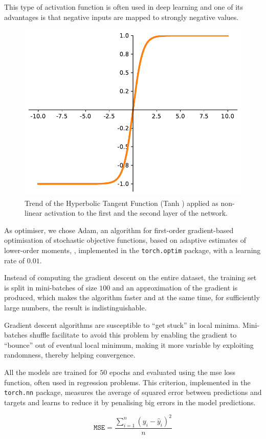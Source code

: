 This type of activation function is often used in deep learning and one of its 
advantages is that negative inputs are mapped to strongly negative values.

\begin{figure}[!htb]
	\centering
	\includegraphics[width=.5\textwidth]{contents/images/tanh2}%
	\caption[Trend of the Tanh activation function.]{Trend of the Hyperbolic 
	Tangent Function (Tanh ) applied as non-linear activation to the first and the 
	second layer of the network.}
	\label{fig:tanh}
\end{figure}

As optimiser, we chose Adam, {an algorithm for first-order gradient-based 
optimisation of stochastic objective functions, based on adaptive estimates of 
lower-order moments}, \cite[see][]{kingma2014adam, 
loshchilov2017decoupled}, 
implemented in the \texttt{torch.optim} package, with a learning rate of $0.01$. 

Instead of computing the gradient descent on the entire dataset, the training set is 
split in mini-batches of size $100$ and an approximation of the gradient is 
produced, which makes the algorithm faster and at the same time, for sufficiently 
large numbers, the result is indistinguishable.

Gradient descent algorithms are susceptible to ``get stuck'' in local minima.
Mini-batches shuffle facilitate to avoid this problem by enabling the gradient to 
``bounce'' out of eventual local minimum, making it more variable by exploiting 
randomness, thereby helping convergence.

All the models are trained for $50$ epochs and evaluated using the \gls{mse} loss 
function, often used in regression problems. 
This criterion, implemented in the \texttt{torch.nn} package, measures the 
average of squared error between predictions and targets and learns to reduce it 
by penalising big errors in the model predictions.

\begin{Equation}[!htb]
	\centering
	\begin{equation}
	\mathtt{MSE} = \frac{\sum_{i=1}^n (y_i-\hat y_i)^2}{n}
	\end{equation}
	\caption{Mean Squared Error (\gls{mse}) loss function.}
	\label{eq:mse}
\end{Equation}
	

